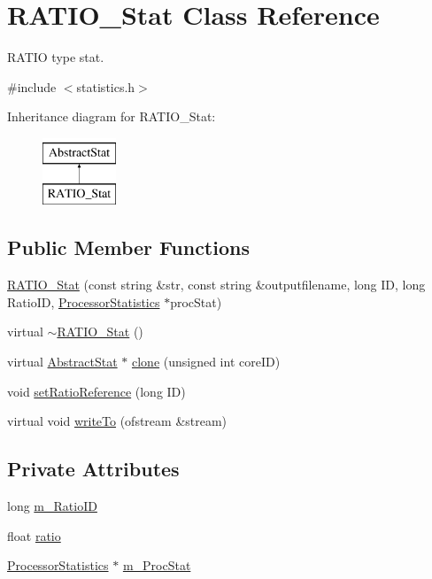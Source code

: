 \hypertarget{classRATIO__Stat}{
\section{RATIO\_\-Stat Class Reference}
\label{classRATIO__Stat}
}


RATIO type stat.  




{\ttfamily \#include $<$statistics.h$>$}

Inheritance diagram for RATIO\_\-Stat:\begin{figure}[H]
\begin{center}
\leavevmode
\includegraphics[height=2.000000cm]{classRATIO__Stat}
\end{center}
\end{figure}
\subsection*{Public Member Functions}
\begin{DoxyCompactItemize}
\item 
\hyperlink{classRATIO__Stat_a4f4a78937a9e1c409fd1bffd69b19869}{RATIO\_\-Stat} (const string \&str, const string \&outputfilename, long ID, long RatioID, \hyperlink{classProcessorStatistics}{ProcessorStatistics} $\ast$procStat)
\item 
virtual \hyperlink{classRATIO__Stat_a5adc98be975fc5f84f0de874a188cf68}{$\sim$RATIO\_\-Stat} ()
\item 
virtual \hyperlink{classAbstractStat}{AbstractStat} $\ast$ \hyperlink{classRATIO__Stat_af0050320d2f308a6c076992e52c9ad27}{clone} (unsigned int coreID)
\item 
void \hyperlink{classRATIO__Stat_a5b5a26cf2443e041d5c5988e9ffa6c05}{setRatioReference} (long ID)
\item 
virtual void \hyperlink{classRATIO__Stat_a0bf776a3a5dbd304185c2fce9d04934e}{writeTo} (ofstream \&stream)
\end{DoxyCompactItemize}
\subsection*{Private Attributes}
\begin{DoxyCompactItemize}
\item 
long \hyperlink{classRATIO__Stat_ad9389292fb4a07b1c5495e4e25ba0ecc}{m\_\-RatioID}
\item 
float \hyperlink{classRATIO__Stat_acf9ee3f1943b126e2d824117de380a28}{ratio}
\item 
\hyperlink{classProcessorStatistics}{ProcessorStatistics} $\ast$ \hyperlink{classRATIO__Stat_a1b31197fd3cb0740bdb32d50c4daec4c}{m\_\-ProcStat}
\end{DoxyCompactItemize}


